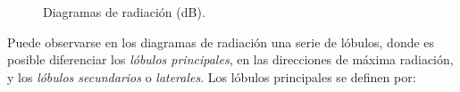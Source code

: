 \begin{figure} [H]
\centering 
{}
\caption{Diagramas de radiación (dB).}
\label{grup_fig_intro:1}
\end{figure}
Puede observarse en los diagramas de radiación una serie de lóbulos, donde es posible diferenciar los \emph{lóbulos principales}, en las direcciones de máxima radiación, y los \emph{lóbulos secundarios} o \emph{laterales}. Los lóbulos principales se definen por:
